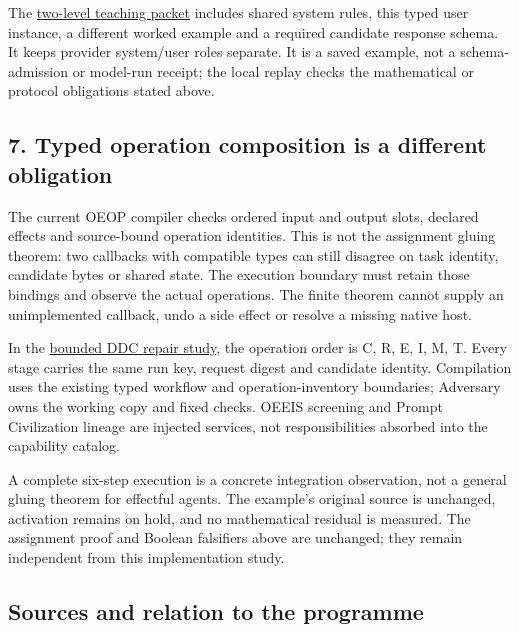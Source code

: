\documentclass[
  11pt,
]{article}
\begin{document}
The
\href{https://github.com/dbccpage/the_symbol_game/blob/main/atlas/coda_atlas/F004_papers/015_pfp/025_pfp_local_to_global_agent_composition/prompts/example.yaml}{two-level
teaching packet} includes shared system rules, this typed user instance,
a different worked example and a required candidate response schema. It
keeps provider system/user roles separate. It is a saved example, not a
schema-admission or model-run receipt; the local replay checks the
mathematical or protocol obligations stated above.

\subsection{7. Typed operation composition is a different
obligation}\label{typed-operation-composition-is-a-different-obligation}

The current OEOP compiler checks ordered input and output slots,
declared effects and source-bound operation identities. This is not the
assignment gluing theorem: two callbacks with compatible types can still
disagree on task identity, candidate bytes or shared state. The
execution boundary must retain those bindings and observe the actual
operations. The finite theorem cannot supply an unimplemented callback,
undo a side effect or resolve a missing native host.

In the
\href{https://github.com/dbccpage/the_symbol_game/blob/main/atlas/coda_atlas/F004_papers/015_pfp/028_pfp_operadic_composition_and_bounded_ddc_repair/paper.md}{bounded
DDC repair study}, the operation order is C, R, E, I, M, T. Every stage
carries the same run key, request digest and candidate identity.
Compilation uses the existing typed workflow and operation-inventory
boundaries; Adversary owns the working copy and fixed checks. OEEIS
screening and Prompt Civilization lineage are injected services, not
responsibilities absorbed into the capability catalog.

A complete six-step execution is a concrete integration observation, not
a general gluing theorem for effectful agents. The example's original
source is unchanged, activation remains on hold, and no mathematical
residual is measured. The assignment proof and Boolean falsifiers above
are unchanged; they remain independent from this implementation study.

\subsection{Sources and relation to the
programme}\label{sources-and-relation-to-the-programme}
\end{document}
